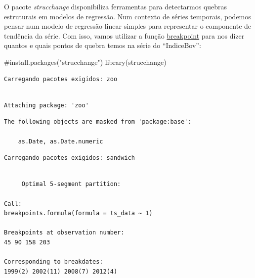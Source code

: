\documentclass[
  letterpaper,
  DIV=11,
  numbers=noendperiod]{scrartcl}
\newenvironment{Shaded}{\begin{snugshade}}{\end{snugshade}}
\newcommand{\AttributeTok}[1]{\textcolor[rgb]{0.40,0.45,0.13}{#1}}
\newcommand{\CommentTok}[1]{\textcolor[rgb]{0.37,0.37,0.37}{#1}}
\newcommand{\DecValTok}[1]{\textcolor[rgb]{0.68,0.00,0.00}{#1}}
\newcommand{\FunctionTok}[1]{\textcolor[rgb]{0.28,0.35,0.67}{#1}}
\newcommand{\NormalTok}[1]{\textcolor[rgb]{0.00,0.23,0.31}{#1}}
\newcommand{\OtherTok}[1]{\textcolor[rgb]{0.00,0.23,0.31}{#1}}
\newcommand{\SpecialCharTok}[1]{\textcolor[rgb]{0.37,0.37,0.37}{#1}}
\begin{document}
O pacote \emph{strucchange} disponibiliza ferramentas para detectarmos
quebras estruturais em modelos de regressão. Num contexto de séries
temporais, podemos pensar num modelo de regressão linear simples para
representar o componente de tendência da série. Com isso, vamos utilizar
a função
\href{https://www.rdocumentation.org/packages/strucchange/versions/1.5-3/topics/breakpoints}{breakpoint}
para nos dizer quantos e quais pontos de quebra temos na série do
``IndiceBov'':

\begin{Shaded}
\begin{Highlighting}[]
\CommentTok{\#install.packages("strucchange")}
\FunctionTok{library}\NormalTok{(strucchange)}
\end{Highlighting}
\end{Shaded}

\begin{verbatim}
Carregando pacotes exigidos: zoo
\end{verbatim}

\begin{verbatim}

Attaching package: 'zoo'
\end{verbatim}

\begin{verbatim}
The following objects are masked from 'package:base':

    as.Date, as.Date.numeric
\end{verbatim}

\begin{verbatim}
Carregando pacotes exigidos: sandwich
\end{verbatim}

\begin{Shaded}
\end{Shaded}

\begin{verbatim}

     Optimal 5-segment partition: 

Call:
breakpoints.formula(formula = ts_data ~ 1)

Breakpoints at observation number:
45 90 158 203 

Corresponding to breakdates:
1999(2) 2002(11) 2008(7) 2012(4) 
\end{verbatim}
\end{document}
